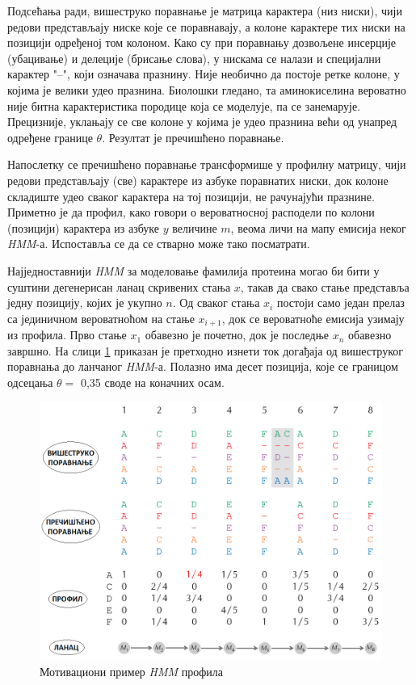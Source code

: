 \documentclass[12pt,oneside]{memoir}
\begin{document}
\begin{CJK}{UTF8}{ipxm}
Подсећања ради, вишеструко поравнање је матрица карактера (низ ниски), чији редови представљају ниске које се поравнавају, а колоне карактере тих ниски на позицији одређеној том колоном. Како су при поравнању дозвољене инсерције (убацивање) и делеције (брисање слова), у нискама се налази и специјални карактер "--", који означава празнину. Није необично да постоје ретке колоне, у којима је велики удео празнина. Биолошки гледано, та аминокиселина вероватно није битна карактеристика породице која се моделује, па се занемарује. Прецизније, уклањају се све колоне у којима је удео празнина већи од унапред одређене границе $\theta$. Резултат је пречишћено поравнање.

Напослетку се пречишћено поравнање трансформише у профилну матрицу, чији редови представљају (све) карактере из азбуке поравнатих ниски, док колоне складиште удео сваког карактера на тој позицији, не рачунајући празнине. Приметно је да профил, како говори о вероватносној расподели по колони (позицији) карактера из азбуке $y$ величине $m$, веома личи на мапу емисија неког \textit{HMM}-а. Испоставља се да се стварно може тако посматрати.

Најједноставнији \textit{HMM} за моделовање фамилија протеина могао би бити у суштини дегенерисан ланац скривених стања $x$, такав да свако стање представља једну позицију, којих је укупно $n$. Од сваког стања $x_i$ постоји само један прелаз са јединичном вероватноћом на стање $x_{i+1}$, док се вероватноће емисија узимају из профила. Прво стање $x_1$ обавезно је почетно, док је последње $x_n$ обавезно завршно. На слици \ref{fig:profil} приказан је претходно изнети ток догађаја од вишеструког поравнања до ланчаног \textit{HMM}-а. Полазно има десет позиција, које се границом одсецања $\theta =$ 0,35 своде на коначних осам.

\begin{figure}[H]
  \centering
  \includegraphics[width=\textwidth]{profil.png}
  \caption{Мотивациони пример \textit{HMM} профила\cite{compeau2015}}
  \label{fig:profil}
\end{figure}


\end{CJK}
\end{document}
